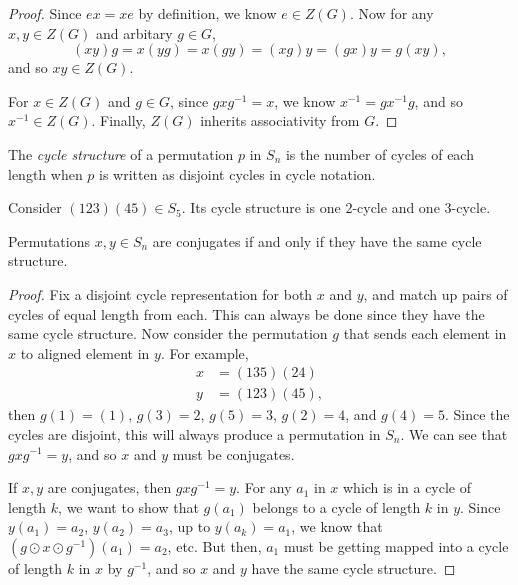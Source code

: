 \begin{proof}
    Since $ex = xe$ by definition, we know $e \in Z(G)$. Now for any $x, y \in Z(G)$ and arbitary $g \in G$,
    \[(xy)g = x(yg) = x(gy) = (xg)y = (gx)y = g(xy),\] and so $xy \in Z(G)$.

    For $x \in Z(G)$ and $g \in G$, since $gxg^{-1} = x$, we know $x^{-1} = gx^{-1}g$, and so $x^{-1} \in Z(G)$. Finally, $Z(G)$ inherits associativity from $G$.
\end{proof}

\begin{defn}
    The \emph{cycle structure} of a permutation $p$ in $S_n$ is the number of cycles of each length when $p$ is written as disjoint cycles in cycle notation.
\end{defn}

\begin{exmp}
    Consider $(123)(45) \in S_5$. Its cycle structure is one $2$-cycle and one $3$-cycle.
\end{exmp}

\begin{thm}\label{cycle-structure-conjugates}
    Permutations $x, y \in S_n$ are conjugates if and only if they have the same cycle structure.
\end{thm}

\begin{proof}
    Fix a disjoint cycle representation for both $x$ and $y$, and match up pairs of cycles of equal length from each. This can always be done since they have the same cycle structure. Now consider the permutation $g$ that sends each element in $x$ to aligned element in $y$. For example,
    \begin{align*}
        x &= (135)(24) \\
        y &= (123)(45),
    \end{align*}
    then $g(1) = (1)$, $g(3) = 2$, $g(5) = 3$, $g(2) = 4$, and $g(4) = 5$. Since the cycles are disjoint, this will always produce a permutation in $S_n$. We can see that $gxg^{-1} = y$, and so $x$ and $y$ must be conjugates.

    If $x, y$ are conjugates, then $gxg^{-1} = y$. For any $a_1$ in $x$ which is in a cycle of length $k$, we want to show that $g(a_1)$ belongs to a cycle of length $k$ in $y$. Since $y(a_1) = a_2$, $y(a_2) = a_3$, up to $y(a_k) = a_1$, we know that $(g \odot x \odot g^{-1})(a_1) = a_2$, etc. But then, $a_1$ must be getting mapped into a cycle of length $k$ in $x$ by $g^{-1}$, and so $x$ and $y$ have the same cycle structure.
\end{proof}

